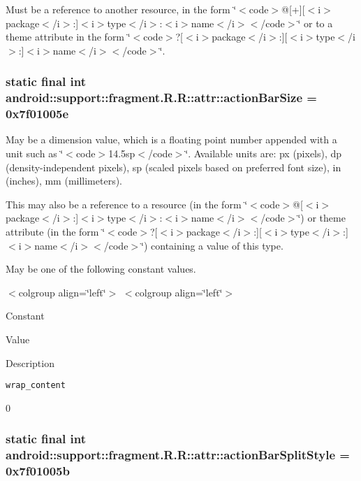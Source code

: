 Must be a reference to another resource, in the form \char`\"{}$<$code$>$@\mbox{[}+\mbox{]}\mbox{[}$<$i$>$package$<$/i$>$:\mbox{]}$<$i$>$type$<$/i$>$:$<$i$>$name$<$/i$>$$<$/code$>$\char`\"{} or to a theme attribute in the form \char`\"{}$<$code$>$?\mbox{[}$<$i$>$package$<$/i$>$:\mbox{]}\mbox{[}$<$i$>$type$<$/i$>$:\mbox{]}$<$i$>$name$<$/i$>$$<$/code$>$\char`\"{}. \hypertarget{classandroid_1_1support_1_1fragment_1_1_r_1_1attr_3f686d954572993a7da21abc693f8bd2}{
\subsubsection[{actionBarSize}]{\setlength{\rightskip}{0pt plus 5cm}static final int android::support::fragment.R.R::attr::actionBarSize = 0x7f01005e}}
\label{classandroid_1_1support_1_1fragment_1_1_r_1_1attr_3f686d954572993a7da21abc693f8bd2}


May be a dimension value, which is a floating point number appended with a unit such as \char`\"{}$<$code$>$14.5sp$<$/code$>$\char`\"{}. Available units are: px (pixels), dp (density-independent pixels), sp (scaled pixels based on preferred font size), in (inches), mm (millimeters). 

This may also be a reference to a resource (in the form \char`\"{}$<$code$>$@\mbox{[}$<$i$>$package$<$/i$>$:\mbox{]}$<$i$>$type$<$/i$>$:$<$i$>$name$<$/i$>$$<$/code$>$\char`\"{}) or theme attribute (in the form \char`\"{}$<$code$>$?\mbox{[}$<$i$>$package$<$/i$>$:\mbox{]}\mbox{[}$<$i$>$type$<$/i$>$:\mbox{]}$<$i$>$name$<$/i$>$$<$/code$>$\char`\"{}) containing a value of this type. 

May be one of the following constant values. \begin{TabularC}{0}
\hline
\end{TabularC}
$<$colgroup align=\char`\"{}left\char`\"{}$>$ $<$colgroup align=\char`\"{}left\char`\"{}$>$ 

Constant

Value

Description 

{\tt wrap\_\-content}

0\hypertarget{classandroid_1_1support_1_1fragment_1_1_r_1_1attr_fc7e90cb00f3903903653ff3ee2550db}{
\subsubsection[{actionBarSplitStyle}]{\setlength{\rightskip}{0pt plus 5cm}static final int android::support::fragment.R.R::attr::actionBarSplitStyle = 0x7f01005b}}
\label{classandroid_1_1support_1_1fragment_1_1_r_1_1attr_fc7e90cb00f3903903653ff3ee2550db}


